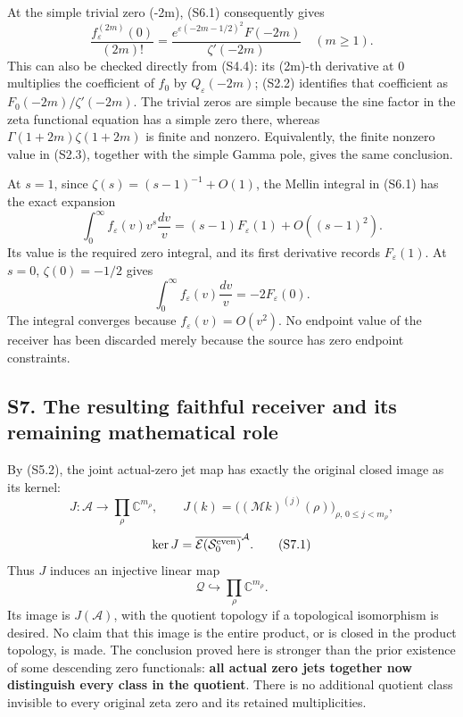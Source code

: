 \documentclass[
]{article}
\begin{document}
At the simple trivial zero (-2m), (S6.1) consequently gives \[
\boxed{
\frac{f_\varepsilon^{(2m)}(0)}{(2m)!}
=\frac{e^{\varepsilon(-2m-1/2)^2}F(-2m)}{\zeta'(-2m)}
\quad(m\ge1).
}
\tag{S6.2}
\] This can also be checked directly from (S4.4): its (2m)-th derivative
at \(0\) multiplies the coefficient of \(f_0\) by
\(Q_\varepsilon(-2m)\); (S2.2) identifies that coefficient as
\(F_0(-2m)/\zeta'(-2m)\). The trivial zeros are simple because the sine
factor in the zeta functional equation has a simple zero there, whereas
\(\Gamma(1+2m)\zeta(1+2m)\) is finite and nonzero. Equivalently, the
finite nonzero value in (S2.3), together with the simple Gamma pole,
gives the same conclusion.

At \(s=1\), since \(\zeta(s)=(s-1)^{-1}+O(1)\), the Mellin integral in
(S6.1) has the exact expansion \[
\int_0^\infty f_\varepsilon(v)v^s\frac{dv}{v}
=(s-1)F_\varepsilon(1)+O((s-1)^2).
\tag{S6.3}
\] Its value is the required zero integral, and its first derivative
records \(F_\varepsilon(1)\). At \(s=0\), \(\zeta(0)=-1/2\) gives \[
\int_0^\infty f_\varepsilon(v)\frac{dv}{v}
=-2F_\varepsilon(0).
\tag{S6.4}
\] The integral converges because \(f_\varepsilon(v)=O(v^2)\). No
endpoint value of the receiver has been discarded merely because the
source has zero endpoint constraints.

\subsection{S7. The resulting faithful receiver and its remaining
mathematical
role}\label{s7.-the-resulting-faithful-receiver-and-its-remaining-mathematical-role}

By (S5.2), the joint actual-zero jet map has exactly the original closed
image as its kernel: \[
J:\mathcal A\longrightarrow
\prod_{\rho}\mathbb C^{m_\rho},
\qquad J(k)=\bigl((\mathcal M k)^{(j)}(\rho)\bigr)_{\rho,\,0\le j<m_\rho},
\] \[
\ker J=\overline{\mathcal E(\mathcal S_0^{\rm even})}^{\mathcal A}.
\tag{S7.1}
\] Thus \(J\) induces an injective linear map \[
\boxed{
\mathcal Q\hookrightarrow\prod_\rho\mathbb C^{m_\rho}.
}
\tag{S7.2}
\] Its image is \(J(\mathcal A)\), with the quotient topology if a
topological isomorphism is desired. No claim that this image is the
entire product, or is closed in the product topology, is made. The
conclusion proved here is stronger than the prior existence of some
descending zero functionals: \textbf{all actual zero jets together now
distinguish every class in the quotient}. There is no additional
quotient class invisible to every original zeta zero and its retained
multiplicities.
\end{document}
